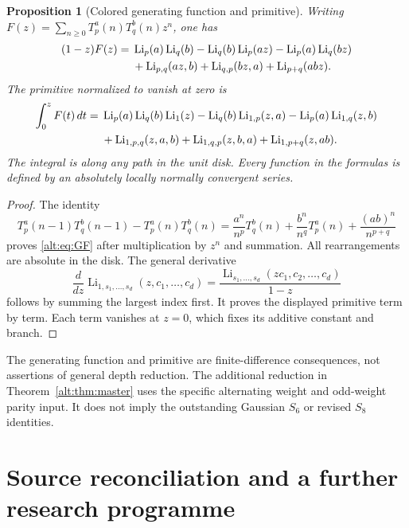 \documentclass[11pt]{article}
\newtheorem{proposition}[theorem]{Proposition}
\theoremstyle{definition}
\theoremstyle{remark}
\numberwithin{equation}{section}
\begin{document}
\begin{proposition}[Colored generating function and primitive]
\label{alt:prop:GF}
Writing $F(z)=\sum_{n\ge0}T_p^a(n)T_q^b(n)z^n$, one has
\begin{align}
 (1-z)F(z)={}&\operatorname{Li}_p(a)\operatorname{Li}_q(b)
 -\operatorname{Li}_q(b)\operatorname{Li}_p(az)
 -\operatorname{Li}_p(a)\operatorname{Li}_q(bz)\notag\\
 &+\operatorname{Li}_{p,q}(az,b)
  +\operatorname{Li}_{q,p}(bz,a)
  +\operatorname{Li}_{p+q}(abz).
 \label{alt:eq:GF}
\end{align}
The primitive normalized to vanish at zero is
\begin{align}
 \int_0^zF(t)\,dt={}&
  \operatorname{Li}_p(a)\operatorname{Li}_q(b)\operatorname{Li}_1(z)
 -\operatorname{Li}_q(b)\operatorname{Li}_{1,p}(z,a)
 -\operatorname{Li}_p(a)\operatorname{Li}_{1,q}(z,b)\notag\\
 &+\operatorname{Li}_{1,p,q}(z,a,b)
  +\operatorname{Li}_{1,q,p}(z,b,a)
  +\operatorname{Li}_{1,p+q}(z,ab).
 \label{alt:eq:primitive}
\end{align}
The integral is along any path in the unit disk. Every function in the
formulas is defined by an absolutely locally normally convergent series.
\end{proposition}
\begin{proof}
The identity
\[
 T_p^a(n-1)T_q^b(n-1)-T_p^a(n)T_q^b(n)
 =\frac{a^n}{n^p}T_q^b(n)+\frac{b^n}{n^q}T_p^a(n)
   +\frac{(ab)^n}{n^{p+q}}
\]
proves \eqref{alt:eq:GF} after multiplication by $z^n$ and summation.
All rearrangements are absolute in the disk. The general derivative
\[
 \frac{d}{dz}\operatorname{Li}_{1,s_1,\ldots,s_d}
                (z,c_1,\ldots,c_d)
 =\frac{\operatorname{Li}_{s_1,\ldots,s_d}
                (zc_1,c_2,\ldots,c_d)}{1-z}
\]
follows by summing the largest index first. It proves the displayed
primitive term by term. Each term vanishes at $z=0$, which fixes its
additive constant and branch.
\end{proof}
The generating function and primitive are finite-difference consequences,
not assertions of general depth reduction. The additional reduction in
Theorem~\ref{alt:thm:master} uses the specific alternating weight and
odd-weight parity input. It does not imply the outstanding Gaussian
$S_6$ or revised $S_8$ identities.


\section{Source reconciliation and a further research programme}
\label{sec:audit}
\end{document}
